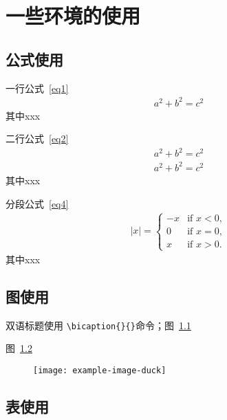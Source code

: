 \documentclass[openright,twoside]{UJS-PhD-thesis}
\begin{document}
\chapter{一些环境的使用}

\section{公式使用}
 一行公式~\eqref{eq1}
\begin{align}
\label{eq1}
a^2+b^2=c^2
\end{align}
其中xxx

 二行公式~\eqref{eq2}
\begin{align}
\label{eq2}
a^2+b^2=c^2\\
\label{eq3}
a^2+b^2=c^2
\end{align}
其中xxx

 分段公式~\eqref{eq4}
\begin{align}
\label{eq4}
|x| =
\begin{cases}
-x & \text{if } x < 0,\\
0 & \text{if } x = 0,\\
x & \text{if } x > 0.
\end{cases}
\end{align}
其中xxx

\section{图使用}

双语标题使用 \verb|\bicaption{}{}|命令；图~\ref{fig2-1} 

\begin{figure}[h!t]
\centering
{}\quad
{}
\label{fig2-1}
\end{figure}

图~\ref{fig2-2} 

\begin{figure}[h!t]
\centering
\texttt{[image: example-image-duck]}
\label{fig2-2}
\end{figure}

\section{表使用}
\end{document}
